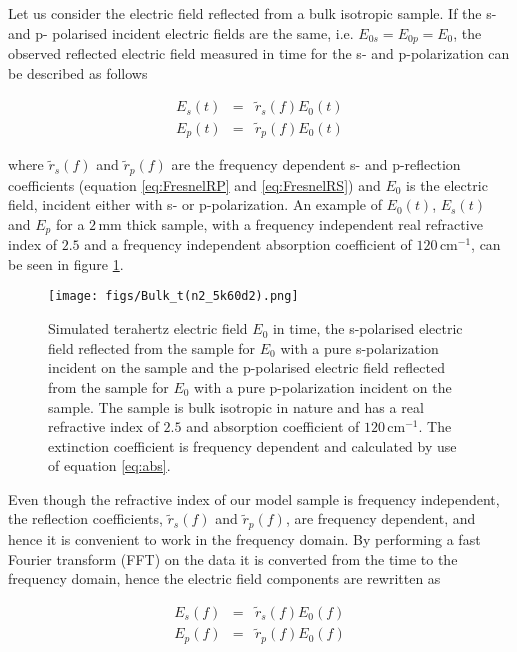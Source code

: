 Let us consider the electric field reflected from a bulk isotropic sample. If the s- and p- polarised incident electric fields are the same, i.e. $E_{0 s} =E_{0 p} = E_{0}$, the observed reflected electric field measured in time for the s- and p-polarization can be described as follows

\begin{eqnarray}
E_{s}(t) &=& \widetilde{r}_{s}(f)E_{0}(t) \label{eq:Es-bulk Time}\\
E_{p}(t) &=& \widetilde{r}_{p}(f)E_{0}(t) \label{eq:Ep-bulk Time}
\end{eqnarray}

where $\widetilde{r}_{s}(f)$ and $\widetilde{r}_{p}(f)$ are the frequency dependent s- and p-reflection coefficients (equation \ref{eq:FresnelRP} and \ref{eq:FresnelRS}) and $E_{0}$ is the electric field, incident either with s- or p-polarization. An example of $E_{0}(t)$, $E_{s}(t)$ and $E_{p}$ for a $2\,$mm thick sample, with a frequency independent real refractive index of $2.5$ and a frequency independent absorption coefficient of $120\,\text{cm}^{-1}$, can be seen in figure \ref{fig:BulkTime}.

\begin{figure}[H]
\begin{center}
	 \texttt{[image: figs/Bulk\_t(n2\_5k60d2).png]}
	 \caption[Simulated bulk isotropic example]{Simulated terahertz electric field $E_{0}$ in time, the s-polarised electric field reflected from the sample for $E_{0}$ with a pure s-polarization incident on the sample and the p-polarised electric field reflected from the sample for $E_{0}$ with a pure p-polarization incident on the sample. The sample is bulk isotropic in nature and has a real refractive index of $2.5$ and absorption coefficient of $120\,\mbox{cm}^{-1}$. The extinction coefficient is frequency dependent and calculated by use of equation \ref{eq:abs}.}
   \label{fig:BulkTime}
\end{center}
\end{figure}

Even though the refractive index of our model sample is frequency independent, the reflection coefficients,  $\widetilde{r}_{s}(f)$ and $\widetilde{r}_{p}(f)$, are frequency dependent, and hence it is convenient to  work in the frequency domain. By performing a fast Fourier transform (FFT) on the data it is converted from the time to the frequency domain, hence the electric field components are rewritten as

\begin{eqnarray}
E_{s}(f) &=& \widetilde{r}_{s}(f)E_{0}(f) \label{eq:Es-bulk Frequency}\\
E_{p}(f) &=& \widetilde{r}_{p}(f)E_{0}(f) \label{eq:Ep-bulk Frequency}
\end{eqnarray}

